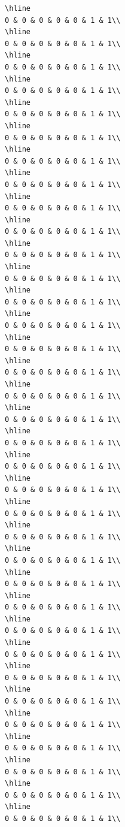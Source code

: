 \documentclass[
]{article}
\begin{document}
\begin{verbatim}
\hline
0 & 0 & 0 & 0 & 0 & 1 & 1\\
\hline
0 & 0 & 0 & 0 & 0 & 1 & 1\\
\hline
0 & 0 & 0 & 0 & 0 & 1 & 1\\
\hline
0 & 0 & 0 & 0 & 0 & 1 & 1\\
\hline
0 & 0 & 0 & 0 & 0 & 1 & 1\\
\hline
0 & 0 & 0 & 0 & 0 & 1 & 1\\
\hline
0 & 0 & 0 & 0 & 0 & 1 & 1\\
\hline
0 & 0 & 0 & 0 & 0 & 1 & 1\\
\hline
0 & 0 & 0 & 0 & 0 & 1 & 1\\
\hline
0 & 0 & 0 & 0 & 0 & 1 & 1\\
\hline
0 & 0 & 0 & 0 & 0 & 1 & 1\\
\hline
0 & 0 & 0 & 0 & 0 & 1 & 1\\
\hline
0 & 0 & 0 & 0 & 0 & 1 & 1\\
\hline
0 & 0 & 0 & 0 & 0 & 1 & 1\\
\hline
0 & 0 & 0 & 0 & 0 & 1 & 1\\
\hline
0 & 0 & 0 & 0 & 0 & 1 & 1\\
\hline
0 & 0 & 0 & 0 & 0 & 1 & 1\\
\hline
0 & 0 & 0 & 0 & 0 & 1 & 1\\
\hline
0 & 0 & 0 & 0 & 0 & 1 & 1\\
\hline
0 & 0 & 0 & 0 & 0 & 1 & 1\\
\hline
0 & 0 & 0 & 0 & 0 & 1 & 1\\
\hline
0 & 0 & 0 & 0 & 0 & 1 & 1\\
\hline
0 & 0 & 0 & 0 & 0 & 1 & 1\\
\hline
0 & 0 & 0 & 0 & 0 & 1 & 1\\
\hline
0 & 0 & 0 & 0 & 0 & 1 & 1\\
\hline
0 & 0 & 0 & 0 & 0 & 1 & 1\\
\hline
0 & 0 & 0 & 0 & 0 & 1 & 1\\
\hline
0 & 0 & 0 & 0 & 0 & 1 & 1\\
\hline
0 & 0 & 0 & 0 & 0 & 1 & 1\\
\hline
0 & 0 & 0 & 0 & 0 & 1 & 1\\
\hline
0 & 0 & 0 & 0 & 0 & 1 & 1\\
\hline
0 & 0 & 0 & 0 & 0 & 1 & 1\\
\hline
0 & 0 & 0 & 0 & 0 & 1 & 1\\
\hline
0 & 0 & 0 & 0 & 0 & 1 & 1\\
\hline
0 & 0 & 0 & 0 & 0 & 1 & 1\\

\end{verbatim}
\end{document}
